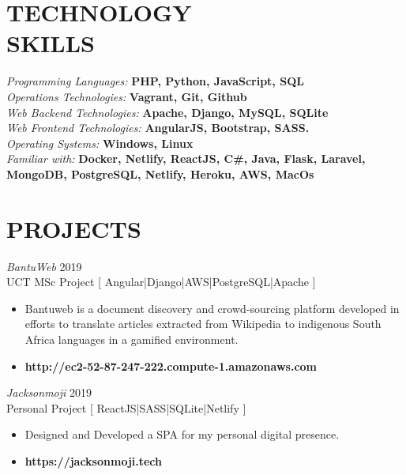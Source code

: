 \documentclass[margin, 10pt]{res}
\begin{document}
\begin{resume}


\section{TECHNOLOGY \\ SKILLS} 

{\sl Programming Languages:} \textbf{PHP, Python, JavaScript, SQL} \\
{\sl Operations Technologies:}\textbf{ Vagrant, Git, Github} \\
{\sl Web Backend Technologies:} \textbf{ Apache, Django, MySQL, SQLite } \\
{\sl Web Frontend Technologies:} \textbf{ AngularJS, Bootstrap, SASS.} \\
{\sl Operating Systems:} \textbf{ Windows, Linux } \\
{\sl Familiar with:} \textbf{ Docker, Netlify, ReactJS, C\#, Java, Flask, Laravel, MongoDB, PostgreSQL, Netlify, Heroku, AWS, MacOs} \\


\section{PROJECTS}

{\sl BantuWeb} \hfill 2019 \\
UCT MSc Project [ Angular|Django|AWS|PostgreSQL|Apache ]
\begin{itemize} \itemsep -2pt %
\item Bantuweb is a document discovery and crowd-sourcing platform developed in efforts to translate articles extracted from Wikipedia to indigenous South Africa languages in a gamified environment.
\item \textbf{http://ec2-52-87-247-222.compute-1.amazonaws.com}
\end{itemize}

{\sl Jacksonmoji} \hfill 2019 \\
Personal Project [ ReactJS|SASS|SQLite|Netlify ]
\begin{itemize} \itemsep -2pt %
\item Designed and Developed a SPA for my personal digital presence.
\item \textbf{https://jacksonmoji.tech}
\end{itemize}



\end{resume}
\end{document}
